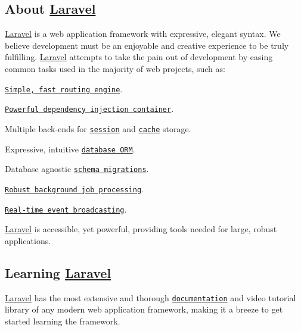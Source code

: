 

\href{https://travis-ci.org/laravel/framework}{\tt } \href{https://packagist.org/packages/laravel/framework}{\tt } \href{https://packagist.org/packages/laravel/framework}{\tt } \href{https://packagist.org/packages/laravel/framework}{\tt } 

\subsection*{About \mbox{\hyperlink{namespace_laravel}{Laravel}}}

\mbox{\hyperlink{namespace_laravel}{Laravel}} is a web application framework with expressive, elegant syntax. We believe development must be an enjoyable and creative experience to be truly fulfilling. \mbox{\hyperlink{namespace_laravel}{Laravel}} attempts to take the pain out of development by easing common tasks used in the majority of web projects, such as\+:


\begin{DoxyItemize}
\item \href{https://laravel.com/docs/routing}{\tt Simple, fast routing engine}.
\item \href{https://laravel.com/docs/container}{\tt Powerful dependency injection container}.
\item Multiple back-\/ends for \href{https://laravel.com/docs/session}{\tt session} and \href{https://laravel.com/docs/cache}{\tt cache} storage.
\item Expressive, intuitive \href{https://laravel.com/docs/eloquent}{\tt database O\+RM}.
\item Database agnostic \href{https://laravel.com/docs/migrations}{\tt schema migrations}.
\item \href{https://laravel.com/docs/queues}{\tt Robust background job processing}.
\item \href{https://laravel.com/docs/broadcasting}{\tt Real-\/time event broadcasting}.
\end{DoxyItemize}

\mbox{\hyperlink{namespace_laravel}{Laravel}} is accessible, yet powerful, providing tools needed for large, robust applications.

\subsection*{Learning \mbox{\hyperlink{namespace_laravel}{Laravel}}}

\mbox{\hyperlink{namespace_laravel}{Laravel}} has the most extensive and thorough \href{https://laravel.com/docs}{\tt documentation} and video tutorial library of any modern web application framework, making it a breeze to get started learning the framework.

